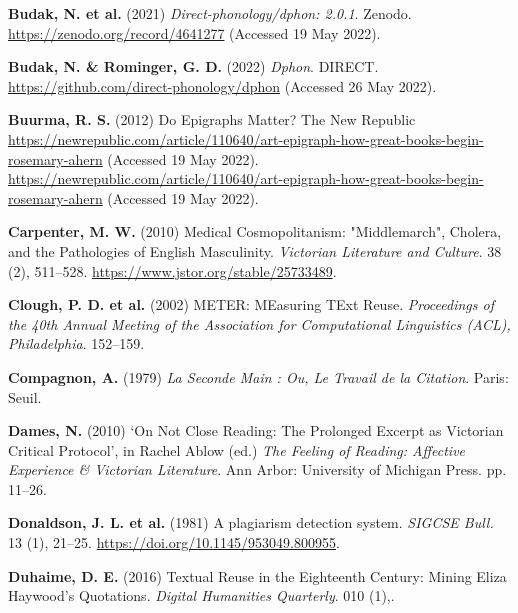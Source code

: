 \documentclass[
]{article}
\newlength{\cslhangindent}
\newlength{\cslentryspacingunit} %
\newenvironment{CSLReferences}[2] %
 {%
  \setlength{\parindent}{0pt}
  \ifodd #1
  \let\oldpar\par
  \def\par{\hangindent=\cslhangindent\oldpar}
  \fi
  \setlength{\parskip}{#2\cslentryspacingunit}
 }%
 {}
\begin{document}
\begin{CSLReferences}{1}{0}
\leavevmode{}%
\textbf{Budak, N. et al.} (2021) \emph{Direct-phonology/dphon: 2.0.1}.
{Zenodo}. \url{https://zenodo.org/record/4641277} (Accessed 19 May
2022).

\leavevmode{}%
\textbf{Budak, N. \& Rominger, G. D.} (2022) \emph{Dphon}. {DIRECT}.
\url{https://github.com/direct-phonology/dphon} (Accessed 26 May 2022).

\leavevmode{}%
\textbf{Buurma, R. S.} (2012) Do {Epigraphs Matter}? The New Republic
\url{https://newrepublic.com/article/110640/art-epigraph-how-great-books-begin-rosemary-ahern}
(Accessed 19 May 2022).
\url{https://newrepublic.com/article/110640/art-epigraph-how-great-books-begin-rosemary-ahern}
(Accessed 19 May 2022).

\leavevmode{}%
\textbf{Carpenter, M. W.} (2010) {Medical Cosmopolitanism}:
"{Middlemarch}", {Cholera}, {and the Pathologies of English
Masculinity}. \emph{Victorian Literature and Culture}. 38 (2), 511--528.
\url{https://www.jstor.org/stable/25733489}.

\leavevmode{}%
\textbf{Clough, P. D. et al.} (2002) {METER}: {MEasuring TExt Reuse}.
\emph{Proceedings of the 40th Annual Meeting of the Association for
Computational Linguistics (ACL), Philadelphia}. 152--159.

\leavevmode{}%
\textbf{Compagnon, A.} (1979) \emph{La {Seconde Main} : {Ou}, {Le
Travail} de la {Citation}}. {Paris}: {Seuil}.

\leavevmode{}%
\textbf{Dames, N.} (2010) {`On {Not Close Reading}: {The Prolonged
Excerpt} as {Victorian Critical Protocol}'}, in Rachel Ablow (ed.)
\emph{The {Feeling} of {Reading}: {Affective Experience} \& {Victorian
Literature}}. {Ann Arbor}: {University of Michigan Press}. pp. 11--26.

\leavevmode{}%
\textbf{Donaldson, J. L. et al.} (1981) A plagiarism detection system.
\emph{SIGCSE Bull.} 13 (1), 21--25.
\url{https://doi.org/10.1145/953049.800955}.

\leavevmode{}%
\textbf{Duhaime, D. E.} (2016) Textual {Reuse} in the {Eighteenth
Century}: {Mining Eliza Haywood}'s {Quotations}. \emph{Digital
Humanities Quarterly}. 010 (1),.


\end{CSLReferences}
\end{document}
